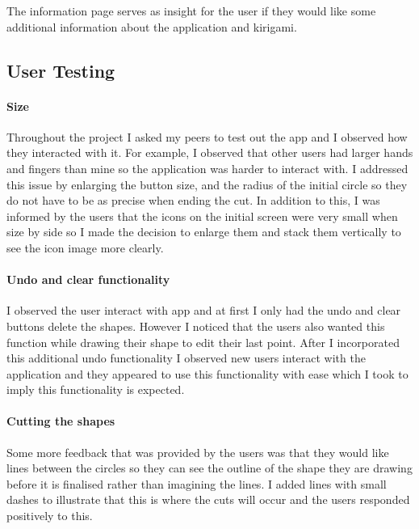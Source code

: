 \documentclass[11pt]{article}
\begin{document}
                    The information page serves as insight for the user if they would like some additional information about the application and kirigami.
               
               \subsection{User Testing}
    
           \paragraph{Size}
           Throughout the project I asked my peers to test out the app and I observed how they interacted with it. For example, I observed that other users had larger hands and fingers than mine so the application was harder to interact with. I addressed this issue by enlarging the button size, and the radius of the initial circle so they do not have to be as precise when ending the cut. In addition to this, I was informed by the users that the icons on the initial screen were very small when size by side so I made the decision to enlarge them and stack them vertically to see the icon image more clearly. 
           
           \paragraph{Undo and clear functionality}
           I observed the user interact with app and at first I only had the undo and clear buttons delete the shapes. However I noticed that the users also wanted this function while drawing their shape to edit their last point. After I incorporated this additional undo functionality I observed new users interact with the application and they appeared to use this functionality with ease which I took to imply this functionality is expected. 
           
           \paragraph{Cutting the shapes}
           Some more feedback that was provided by the users was that they would like lines between the circles so they can see the outline of the shape they are drawing before it is finalised rather than imagining the lines. I added lines with small dashes to illustrate that this is where the cuts will occur and the users responded positively to this. 
           
\end{document}
